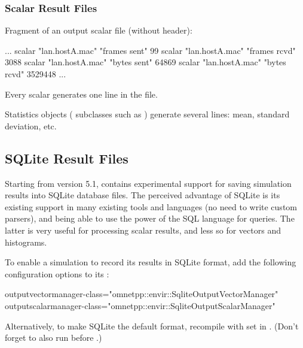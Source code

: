 \subsubsection{Scalar Result Files}
\label{sec:ana-sim:scalar-result-files}

Fragment of an output scalar file (without header):

\begin{filelisting}
...
scalar "lan.hostA.mac" "frames sent"  99
scalar "lan.hostA.mac" "frames rcvd"  3088
scalar "lan.hostA.mac" "bytes sent"   64869
scalar "lan.hostA.mac" "bytes rcvd"   3529448
...
\end{filelisting}

Every scalar generates one  line in the file.

Statistics objects ( subclasses such as )
generate several lines: mean, standard deviation, etc.



\subsection{SQLite Result Files}
\label{sec:ana-sim:sqlite-result-files}

Starting from version 5.1, {\opp} contains experimental support for
saving simulation results into SQLite database files. The perceived advantage
of SQLite is its existing support in many existing tools and languages (no need to
write custom parsers), and being able to use the power of the SQL language
for queries. The latter is very useful for processing scalar results, and less
so for vectors and histograms.

To enable a simulation to record its results in SQLite format, add the following
configuration options to its :

\begin{inifile}
outputvectormanager-class="omnetpp::envir::SqliteOutputVectorManager"
outputscalarmanager-class="omnetpp::envir::SqliteOutputScalarManager"
\end{inifile}

\begin{note}
Alternatively, to make SQLite the default format, recompile {\opp} with
 set in .
(Don't forget to also run   before .)
\end{note}

